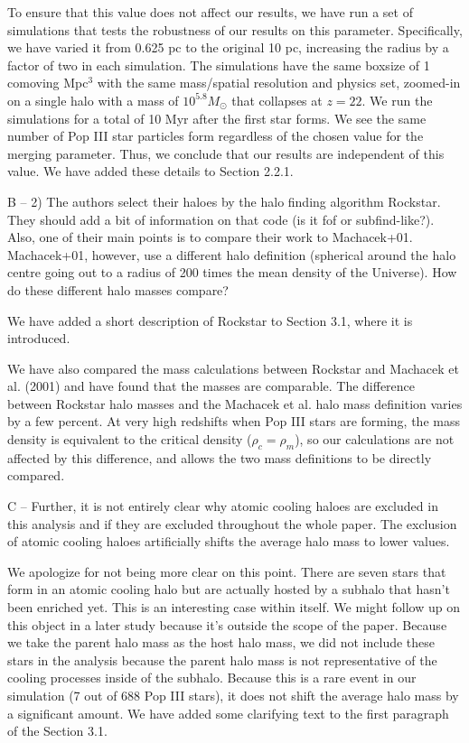 \documentclass[11pt]{article}
\newenvironment{referee}[1][]{%
    \ignorespaces%
    \begin{mdframed}[style=myquotestyle,#1]%
}{%
    \end{mdframed}%
    \ignorespacesafterend%
}%
\begin{document}
To ensure that this value does not affect our results, we have run a set of simulations that tests the robustness of our results on this parameter.  Specifically, we have varied it from 0.625 pc to the original 10 pc, increasing the radius by a factor of two in each simulation. The simulations have the same boxsize of 1 comoving Mpc$^3$ with the same mass/spatial resolution and physics set, zoomed-in on a single halo with a mass of $10^{5.8} M_{\odot}$ that collapses at $z = 22$. We run the  simulations for a total of 10 Myr after the first star forms. We see the same number of Pop III star particles form regardless of the chosen value for the merging parameter. Thus, we conclude that our results are independent of this value. We have added these details to Section 2.2.1. 

\begin{referee}
B -- 2) The authors select their haloes by the halo finding algorithm Rockstar. They should add a bit of information on that code (is it fof or subfind-like?). Also, one of their main points is to compare their work to Machacek+01. Machacek+01, however, use a different halo definition (spherical around the halo centre going out to a radius of 200 times the mean density of the Universe). How do these different halo masses compare?
\end{referee}

We have added a short description of Rockstar to Section 3.1, where it is introduced.

We have also compared the mass calculations between Rockstar and Machacek et al. (2001) and have found that the masses are comparable. The difference between Rockstar halo masses and the Machacek et al. halo mass definition varies by a few percent. At very high redshifts when Pop III stars are forming, the mass density is equivalent to the critical density ($\rho_c = \rho_m$), so our calculations are not affected by this difference, and allows the two mass definitions to be directly compared. 

\begin{referee}
C -- Further, it is not entirely clear why atomic cooling haloes are excluded in this analysis and if they are excluded throughout the whole paper. The exclusion of atomic cooling haloes artificially shifts the average halo mass to lower values.
\end{referee}

We apologize for not being more clear on this point.  There are seven stars that form in an atomic cooling halo but are actually hosted by a subhalo that hasn't been enriched yet. This is an interesting case within itself.  We might follow up on this object in a later study because it's outside the scope of the paper.  Because we take the parent halo mass as the host halo mass, we did not include these stars in the analysis because the parent halo mass is not representative of the cooling processes inside of the subhalo.  Because this is a rare event in our simulation (7 out of 688 Pop III stars), it does not shift the average halo mass by a significant amount.  We have added some clarifying text to the first paragraph of the Section 3.1.
\end{document}
